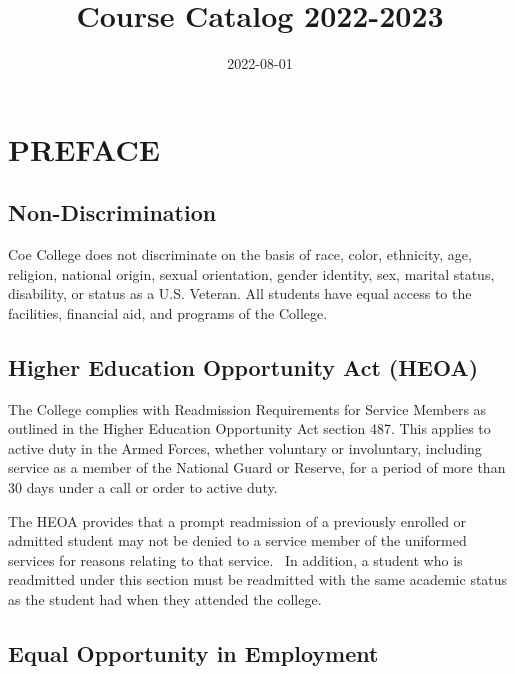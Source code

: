 \documentclass[
  letterpaper,
]{scrbook}
\title{Course Catalog 2022-2023}
\author{}
\date{2022-08-01}
\renewcommand*\contentsname{Table of contents}
\newcommand\contentsname{Table of contents}
\begin{document}
\frontmatter
\maketitle

\renewcommand*\contentsname{Table of contents}
{
\setcounter{tocdepth}{1}
\tableofcontents
}
\mainmatter
{}

\chapter*{PREFACE}\label{preface}


\section*{Non-Discrimination}\label{non-discrimination}


Coe College does not discriminate on the basis of race, color,
ethnicity, age, religion, national origin, sexual orientation, gender
identity, sex, marital status, disability, or status as a U.S. Veteran.
All students have equal access to the facilities, financial aid, and
programs of the College.

\section*{Higher Education Opportunity Act
(HEOA)}\label{higher-education-opportunity-act-heoa}


The College complies with Readmission Requirements for Service Members
as outlined in the Higher Education Opportunity Act section 487. This
applies to active duty in the Armed Forces, whether voluntary or
involuntary, including service as a member of the National Guard or
Reserve, for a period of more than 30 days under a call or order to
active duty.

The HEOA provides that a prompt readmission of a previously enrolled or
admitted student may not be denied to a service member of the uniformed
services for reasons relating to that service.~ In addition, a student
who is readmitted under this section must be readmitted with the same
academic status as the student had when they attended the college.

\section*{Equal Opportunity in
Employment}\label{equal-opportunity-in-employment}
\end{document}
